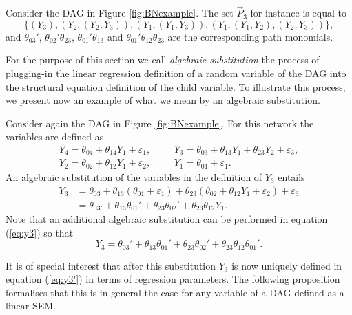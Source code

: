 \begin{example}
Consider the DAG in Figure \ref{fig:BNexample}. The set $\vec{P}_3$ for instance is equal to
\begin{equation}
\label{eq:paths}
\{(Y_3),(Y_2,(Y_2,Y_3)), (Y_1,(Y_1,Y_3)), (Y_1,(Y_1,Y_2),(Y_2,Y_3))\},
\end{equation}
and $\theta_{03}'$, $\theta_{02}'\theta_{23}$, $\theta_{01}'\theta_{13}$ and $\theta_{01}'\theta_{12}\theta_{23}$ are the corresponding path monomials.
\end{example}

For the purpose of this section we call \textit{algebraic substitution} the process of plugging-in the linear regression definition of a random variable of the DAG into the structural equation definition of the child variable. To illustrate this process, we present now an example of what we mean by an algebraic substitution. 

\begin{example}
Consider again the DAG in Figure \ref{fig:BNexample}. For this network the variables are defined as
\begin{equation*}
\begin{array}{lccl}
Y_4=\theta_{04}+\theta_{14}Y_1+\varepsilon_1, &&& Y_3=\theta_{03}+\theta_{13}Y_1+\theta_{23}Y_2+\varepsilon_3,\\
Y_2=\theta_{02}+\theta_{12}Y_1+\varepsilon_2,&&& Y_1=\theta_{01}+\varepsilon_1.
\end{array}
\end{equation*}
An algebraic substitution of the variables in the definition of $Y_3$ entails
\begin{align}
Y_3&=\theta_{03}+\theta_{13}(\theta_{01}+\varepsilon_1)+\theta_{23}(\theta_{02}+\theta_{12}Y_1+\varepsilon_2)+\varepsilon_3\nonumber\\
&=\theta_{03'}+\theta_{13}\theta_{01}'+\theta_{23}\theta_{02}'+\theta_{23}\theta_{12}Y_1.\label{eq:y3}
\end{align}
Note that an additional algebraic substitution can be performed in equation (\ref{eq:y3}) so that 
\begin{equation}
Y_3=\theta_{03}'+\theta_{13}\theta_{01}'+\theta_{23}\theta_{02}'+\theta_{23}\theta_{12}\theta_{01}'.\label{eq:y3'}
\end{equation}
\end{example}
It is of special interest that after this substitution $Y_3$ is now uniquely defined in equation (\ref{eq:y3'}) in terms of regression parameters. The following proposition formalises that this is in general the case for any variable of a DAG defined as a linear SEM.

